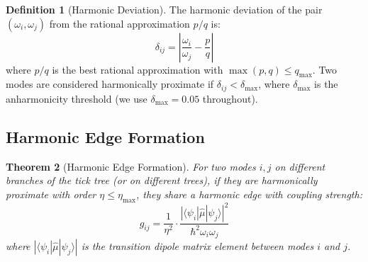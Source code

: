 \documentclass[11pt,twocolumn,a4paper]{article}
\newtheorem{theorem}{Theorem}[section]
\theoremstyle{definition}
\newtheorem{definition}[theorem]{Definition}
\theoremstyle{remark}
\newcommand{\qmax}{q_{\mathrm{max}}}
\newcommand{\etamax}{\eta_{\mathrm{max}}}
\begin{document}
\begin{definition}[Harmonic Deviation]
\label{def:harmonic_deviation}
The harmonic deviation of the pair $(\omega_i, \omega_j)$ from the rational approximation $p/q$ is:
\begin{equation}
\delta_{ij} = \left| \frac{\omega_i}{\omega_j} - \frac{p}{q} \right|
\label{eq:harmonic_deviation}
\end{equation}
where $p/q$ is the best rational approximation with $\max(p, q) \leq \qmax$. Two modes are considered harmonically proximate if $\delta_{ij} < \delta_{\max}$, where $\delta_{\max}$ is the anharmonicity threshold (we use $\delta_{\max} = 0.05$ throughout).
\end{definition}

\subsection{Harmonic Edge Formation}

\begin{theorem}[Harmonic Edge Formation]
\label{thm:harmonic_edge}
For two modes $i, j$ on different branches of the tick tree (or on different trees), if they are harmonically proximate with order $\eta \leq \etamax$, they share a harmonic edge with coupling strength:
\begin{equation}
g_{ij} = \frac{1}{\eta^2} \cdot \frac{|\langle \psi_i | \hat{\mu} | \psi_j \rangle|^2}{\hbar^2 \omega_i \omega_j}
\label{eq:coupling_strength}
\end{equation}
where $|\langle \psi_i | \hat{\mu} | \psi_j \rangle|$ is the transition dipole matrix element between modes $i$ and $j$.
\end{theorem}
\end{document}
